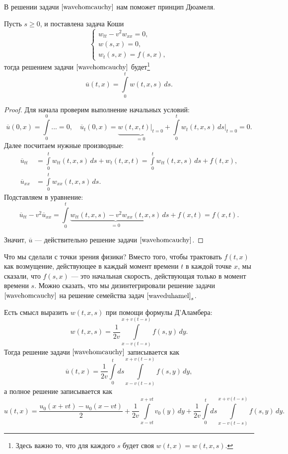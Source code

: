 В решении задачи $\eqref{wavehomcauchy}$ нам поможет принцип Дюамеля.
\begin{theorem}[Дюамель] Пусть $s \geq 0$, и поставлена задача Коши
\begin{equation}
	\begin{cases}
		w_{tt} - v^2 w_{xx} = 0, \\
		w(s,x) = 0, \\
		w_t(s,x) = f(s,x),
	\end{cases}
\label{waveduhamel}
\end{equation}
тогда решением задачи $\eqref{wavehomcauchy}$ будет\footnote{Здесь важно то, что для каждого $s$ будет своя $w(t,x) = w(t,x,s)$.}
$$ \overline{u}(t,x) = \int \limits_0^t w(t,x,s) \, ds.$$
\end{theorem}
\begin{proof}
Для начала проверим выполнение начальных условий:
$$\overline{u} (0,x) = \int \limits_0^0 ... = 0, \quad \overline{u}_t (0,x) = \underbrace {w(t,x,t) \Bigg\rvert_{t=0}}_{= 0} + \int \limits_0^t w_t(t,x,s) \, ds \Bigg\rvert_{t=0} = 0.$$
Далее посчитаем нужные производные:
\begin{align*}
	\overline{u}_{tt} &= \int \limits_0^t w_{tt} (t,x,s) \, ds + w_t (t, x, t) = \int \limits_0^t w_{tt} (t,x,s) \, ds + f(t,x), \\
	\overline{u}_{xx} &= \int \limits_0^t w_{xx} (t,x,s) \, ds.
\end{align*}
Подставляем в уравнение:
$$ \overline{u}_{tt} - v^2 \overline{u}_{xx} = \int \limits_0^t \underbrace{w_{tt}(t,x,s) - v^2 w_{xx}(t,x,s)}_{= 0} \, ds + f(x,t) = f(x,t).$$

Значит, $\overline{u}$ --- действительно решение задачи $\eqref{wavehomcauchy}$.

\end{proof}
Что мы сделали с точки зрения физики? Вместо того, чтобы трактовать $f(t,x)$ как возмущение, действующее в каждый момент времени $t$ в каждой точке $x$, мы сказали, что $f(s,x)$ --- это начальная скорость, действующая только в момент времени $s$. Можно сказать, что мы дизинтегрировали решение задачи $\eqref{wavehomcauchy}$ на решение семейства задач $\eqref{waveduhamel}_s$.

Есть смысл выразить $w(t,x,s)$ при помощи формулы Д'Аламбера:
$$ w(t,x,s) = \frac {1} {2v} \int \limits_{x-v(t-s)}^{x+v(t-s)} f(s,y) \, dy. $$
Тогда решение задачи  $\eqref{wavehomcauchy}$ записывается как
$$ \overline{u} (t,x) = \frac {1} {2v} \int \limits_0^t ds \int \limits_{x-v(t-s)}^{x+v(t-s)} f(s,y) \, dy,$$
а полное решение записывается как $$u(t,x) = \frac {u_0 (x+vt) - u_0 (x-vt)} {2} + \frac {1} {2v} \int \limits_{x-vt}^{x+vt} v_0(y) \, dy + \frac {1} {2v} \int \limits_0^t ds \int \limits_{x-v(t-s)}^{x+v(t-s)} f(s,y) \, dy.$$

